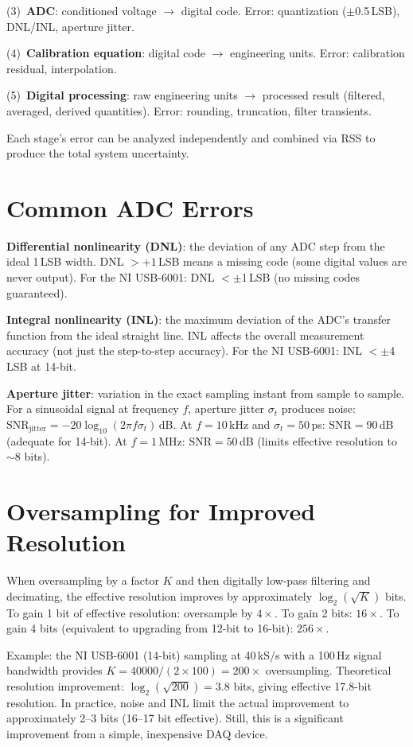 \documentclass[11pt,letterpaper,twoside,openany]{book}
\begin{document}
(3)~\textbf{ADC}: conditioned voltage $\to$ digital code. Error: quantization ($\pm$0.5\,LSB), DNL/INL, aperture jitter.

(4)~\textbf{Calibration equation}: digital code $\to$ engineering units. Error: calibration residual, interpolation.

(5)~\textbf{Digital processing}: raw engineering units $\to$ processed result (filtered, averaged, derived quantities). Error: rounding, truncation, filter transients.

Each stage's error can be analyzed independently and combined via RSS to produce the total system uncertainty.

\section{Common ADC Errors}
\textbf{Differential nonlinearity (DNL)}: the deviation of any ADC step from the ideal 1\,LSB width. DNL $> +1$\,LSB means a missing code (some digital values are never output). For the NI USB-6001: DNL $< \pm$1\,LSB (no missing codes guaranteed).

\textbf{Integral nonlinearity (INL)}: the maximum deviation of the ADC's transfer function from the ideal straight line. INL affects the overall measurement accuracy (not just the step-to-step accuracy). For the NI USB-6001: INL $< \pm$4\,LSB at 14-bit.

\textbf{Aperture jitter}: variation in the exact sampling instant from sample to sample. For a sinusoidal signal at frequency $f$, aperture jitter $\sigma_t$ produces noise: $\text{SNR}_{\text{jitter}} = -20\log_{10}(2\pi f \sigma_t)$\,dB. At $f = 10$\,kHz and $\sigma_t = 50$\,ps: $\text{SNR} = 90$\,dB (adequate for 14-bit). At $f = 1$\,MHz: $\text{SNR} = 50$\,dB (limits effective resolution to $\sim$8 bits).

\section{Oversampling for Improved Resolution}
When oversampling by a factor $K$ and then digitally low-pass filtering and decimating, the effective resolution improves by approximately $\log_2(\sqrt{K})$ bits. To gain 1 bit of effective resolution: oversample by $4\times$. To gain 2 bits: $16\times$. To gain 4 bits (equivalent to upgrading from 12-bit to 16-bit): $256\times$.

Example: the NI USB-6001 (14-bit) sampling at 40\,kS/s with a 100\,Hz signal bandwidth provides $K = 40000/(2 \times 100) = 200\times$ oversampling. Theoretical resolution improvement: $\log_2(\sqrt{200}) = 3.8$ bits, giving effective 17.8-bit resolution. In practice, noise and INL limit the actual improvement to approximately 2--3 bits (16--17 bit effective). Still, this is a significant improvement from a simple, inexpensive DAQ device.
\end{document}
